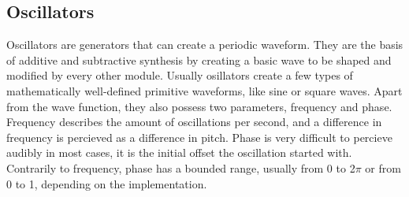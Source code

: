 \documentclass[11pt,a4paper]{article}
\begin{document}
\subsection{Oscillators}

Oscillators are generators that can create a periodic waveform. They are the basis of additive and subtractive synthesis by creating a basic wave to be shaped and modified by every other module. Usually osillators create a few types of mathematically well-defined primitive waveforms, like sine or square waves. Apart from the wave function, they also possess two parameters, frequency and phase. Frequency describes the amount of oscillations per second, and a difference in frequency is percieved as a difference in pitch. Phase is very difficult to percieve audibly in most cases, it is the initial offset the oscillation started with. Contrarily to frequency, phase has a bounded range, usually from 0 to 2$\pi$ or from 0 to 1, depending on the implementation.
\end{document}
